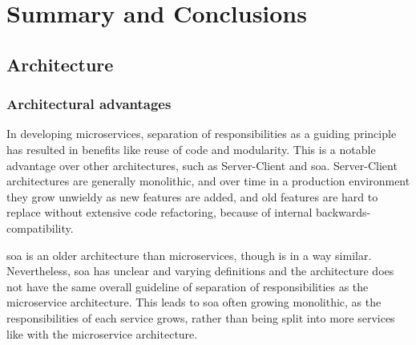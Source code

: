 \chapter{Summary and Conclusions} %
\label{chapterSummary}



\section{Architecture}
\subsection{Architectural advantages}
In developing microservices, separation of responsibilities as a guiding principle has resulted in benefits like reuse of code and modularity. This is a notable advantage over other architectures, such as Server-Client and \acrlong{soa}. 
Server-Client architectures are generally monolithic, and over time in a production environment they grow unwieldy as new features are added, and old features are hard to replace without extensive code refactoring, because of internal backwards-compatibility.

\acrlong{soa} is an older architecture than microservices, though is in a way similar. Nevertheless, \acrshort{soa} has unclear and varying definitions and the architecture does not have the same overall guideline of separation of responsibilities as the microservice architecture. This leads to \acrshort{soa} often growing monolithic, as the responsibilities of each service grows, rather than being split into more services like with the microservice architecture.  

